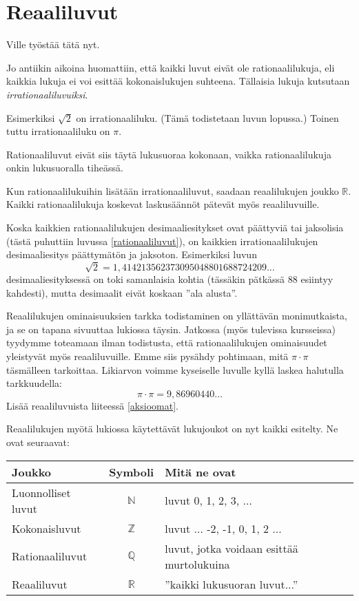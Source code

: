 \chapter{Reaaliluvut}

Ville työstää tätä nyt.

Jo antiikin aikoina huomattiin, että kaikki luvut eivät ole rationaalilukuja, eli kaikkia lukuja ei voi esittää kokonaislukujen suhteena. Tällaisia lukuja kutsutaan \emph{irrationaaliluvuiksi}.

Esimerkiksi $\sqrt{2}$ on irrationaaliluku. (Tämä todistetaan
luvun lopussa.) Toinen tuttu irrationaaliluku on $\pi$.

Rationaaliluvut eivät siis täytä lukusuoraa kokonaan, vaikka
rationaalilukuja onkin lukusuoralla tiheässä.


Kun rationaalilukuihin lisätään irrationaaliluvut, saadaan reaalilukujen joukko $\mathbb{R}$. Kaikki rationaalilukuja koskevat
laskusäännöt pätevät myös reaaliluvuille.

Koska kaikkien rationaalilukujen desimaaliesitykset ovat päättyviä tai jaksolisia (tästä puhuttiin luvussa \ref{rationaaliluvut}), on
kaikkien irrationaalilukujen desimaaliesitys päättymätön ja jaksoton. Esimerkiksi luvun
\[\sqrt{2}= 1,414213562373095048801688724209\ldots\]
desimaaliesityksessä on toki samanlaisia kohtia
(tässäkin pätkässä 88 esiintyy kahdesti), mutta desimaalit eivät koskaan ''ala alusta''.

Reaalilukujen ominaisuuksien tarkka todistaminen on yllättävän monimutkaista, ja se on tapana sivuuttaa lukiossa täysin. Jatkossa
(myös tulevissa kursseissa) tyydymme toteamaan ilman todistusta, että rationaalilukujen ominaisuudet yleistyvät myös reaaliluvuille.
Emme siis pysähdy pohtimaan, mitä $\pi \cdot \pi$ täsmälleen tarkoittaa. Likiarvon voimme kyseiselle luvulle kyllä laskea
halutulla tarkkuudella:
\[ \pi\cdot \pi =9,86960440\ldots \]
Lisää reaaliluvuista liiteessä \ref{aksioomat}.

Reaalilukujen myötä lukiossa käytettävät lukujoukot on nyt kaikki esitelty. Ne ovat seuraavat:
\begin{center}\begin{tabular}{l|c|l}
Joukko & Symboli & Mitä ne ovat\\
\hline
Luonnolliset luvut & $\mathbb{N}$ &
luvut 0, 1, 2, 3, $\ldots$ \\
Kokonaisluvut & $\mathbb{Z}$ & luvut $\ldots$ -2, -1, 0, 1, 2 $\ldots$ \\
Rationaaliluvut & $\mathbb{Q}$ & luvut, jotka voidaan esittää
murtolukuina \\
Reaaliluvut & $\mathbb{R}$ & ''kaikki lukusuoran luvut...''
\end{tabular} \end{center}


